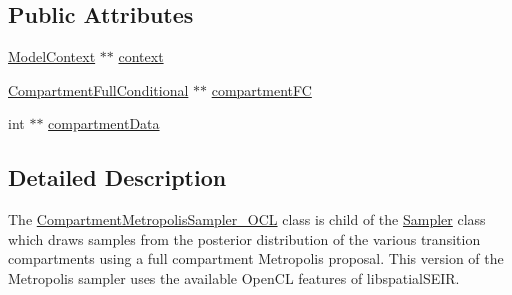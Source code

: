 \subsection*{Public Attributes}
\begin{DoxyCompactItemize}
\item 
\hyperlink{classSpatialSEIR_1_1ModelContext}{Model\-Context} $\ast$$\ast$ \hyperlink{classSpatialSEIR_1_1CompartmentMetropolisSampler__OCL_a231d67f96a0b9e2834b600804f1b06a1}{context}
\item 
\hyperlink{classSpatialSEIR_1_1CompartmentFullConditional}{Compartment\-Full\-Conditional} $\ast$$\ast$ \hyperlink{classSpatialSEIR_1_1CompartmentMetropolisSampler__OCL_a794de19e975d79673a8c7b9c952ce075}{compartment\-F\-C}
\item 
int $\ast$$\ast$ \hyperlink{classSpatialSEIR_1_1CompartmentMetropolisSampler__OCL_a4bcbbab42aac73ed628addf8d7a93526}{compartment\-Data}
\end{DoxyCompactItemize}


\subsection{Detailed Description}
The \hyperlink{classSpatialSEIR_1_1CompartmentMetropolisSampler__OCL}{Compartment\-Metropolis\-Sampler\-\_\-\-O\-C\-L} class is child of the \hyperlink{classSpatialSEIR_1_1Sampler}{Sampler} class which draws samples from the posterior distribution of the various transition compartments using a full compartment Metropolis proposal. This version of the Metropolis sampler uses the available Open\-C\-L features of libspatial\-S\-E\-I\-R. 

